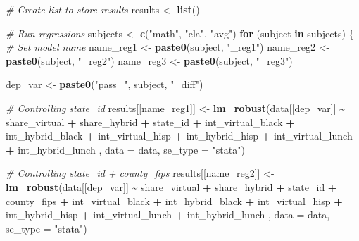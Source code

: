 \documentclass[
]{article}
\newenvironment{Shaded}{\begin{snugshade}}{\end{snugshade}}
\newcommand{\AttributeTok}[1]{\textcolor[rgb]{0.13,0.29,0.53}{#1}}
\newcommand{\CommentTok}[1]{\textcolor[rgb]{0.56,0.35,0.01}{\textit{#1}}}
\newcommand{\ControlFlowTok}[1]{\textcolor[rgb]{0.13,0.29,0.53}{\textbf{#1}}}
\newcommand{\FunctionTok}[1]{\textcolor[rgb]{0.13,0.29,0.53}{\textbf{#1}}}
\newcommand{\NormalTok}[1]{#1}
\newcommand{\OtherTok}[1]{\textcolor[rgb]{0.56,0.35,0.01}{#1}}
\newcommand{\SpecialCharTok}[1]{\textcolor[rgb]{0.81,0.36,0.00}{\textbf{#1}}}
\newcommand{\StringTok}[1]{\textcolor[rgb]{0.31,0.60,0.02}{#1}}
\begin{document}
\begin{Shaded}
\begin{Highlighting}[]
\CommentTok{\# Create list to store results}
\NormalTok{results }\OtherTok{\textless{}{-}} \FunctionTok{list}\NormalTok{()}

\CommentTok{\# Run regressions}
\NormalTok{subjects }\OtherTok{\textless{}{-}} \FunctionTok{c}\NormalTok{(}\StringTok{"math"}\NormalTok{, }\StringTok{"ela"}\NormalTok{, }\StringTok{"avg"}\NormalTok{)}
\ControlFlowTok{for}\NormalTok{ (subject }\ControlFlowTok{in}\NormalTok{ subjects) \{}
  \CommentTok{\# Set model name}
\NormalTok{  name\_reg1 }\OtherTok{\textless{}{-}} \FunctionTok{paste0}\NormalTok{(subject, }\StringTok{"\_reg1"}\NormalTok{)}
\NormalTok{  name\_reg2 }\OtherTok{\textless{}{-}} \FunctionTok{paste0}\NormalTok{(subject, }\StringTok{"\_reg2"}\NormalTok{)}
\NormalTok{  name\_reg3 }\OtherTok{\textless{}{-}} \FunctionTok{paste0}\NormalTok{(subject, }\StringTok{"\_reg3"}\NormalTok{)}
  
\NormalTok{  dep\_var }\OtherTok{\textless{}{-}} \FunctionTok{paste0}\NormalTok{(}\StringTok{"pass\_"}\NormalTok{, subject, }\StringTok{"\_diff"}\NormalTok{)}
  
  \CommentTok{\# Controlling state\_id}
\NormalTok{  results[[name\_reg1]] }\OtherTok{\textless{}{-}} \FunctionTok{lm\_robust}\NormalTok{(data[[dep\_var]] }\SpecialCharTok{\textasciitilde{}}\NormalTok{ share\_virtual }\SpecialCharTok{+}\NormalTok{ share\_hybrid }
                                    \SpecialCharTok{+}\NormalTok{ state\_id }
                                    \SpecialCharTok{+}\NormalTok{ int\_virtual\_black }\SpecialCharTok{+}\NormalTok{ int\_hybrid\_black }
                                    \SpecialCharTok{+}\NormalTok{ int\_virtual\_hisp }\SpecialCharTok{+}\NormalTok{ int\_hybrid\_hisp }
                                    \SpecialCharTok{+}\NormalTok{ int\_virtual\_lunch }\SpecialCharTok{+}\NormalTok{ int\_hybrid\_lunch}
\NormalTok{                                    , }\AttributeTok{data =}\NormalTok{ data, }\AttributeTok{se\_type =} \StringTok{"stata"}\NormalTok{)}

  \CommentTok{\# Controlling state\_id + county\_fips}
\NormalTok{  results[[name\_reg2]] }\OtherTok{\textless{}{-}} \FunctionTok{lm\_robust}\NormalTok{(data[[dep\_var]] }\SpecialCharTok{\textasciitilde{}}\NormalTok{ share\_virtual }\SpecialCharTok{+}\NormalTok{ share\_hybrid }
                                    \SpecialCharTok{+}\NormalTok{ state\_id }\SpecialCharTok{+}\NormalTok{ county\_fips}
                                    \SpecialCharTok{+}\NormalTok{ int\_virtual\_black }\SpecialCharTok{+}\NormalTok{ int\_hybrid\_black }
                                    \SpecialCharTok{+}\NormalTok{ int\_virtual\_hisp }\SpecialCharTok{+}\NormalTok{ int\_hybrid\_hisp }
                                    \SpecialCharTok{+}\NormalTok{ int\_virtual\_lunch }\SpecialCharTok{+}\NormalTok{ int\_hybrid\_lunch}
\NormalTok{                                    , }\AttributeTok{data =}\NormalTok{ data, }\AttributeTok{se\_type =} \StringTok{"stata"}\NormalTok{)}


\end{Highlighting}
\end{Shaded}
\end{document}
